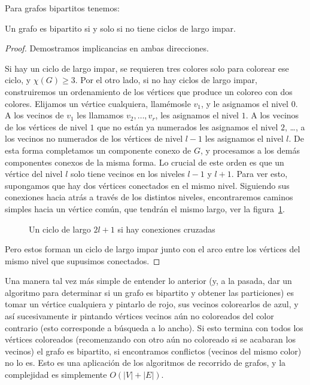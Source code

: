   Para grafos bipartitos tenemos:
  \begin{theorem}
    Un grafo es bipartito
    si y solo si no tiene ciclos de largo impar.
  \end{theorem}
  \begin{proof}
    Demostramos implicancias en ambas direcciones.

    Si hay un ciclo de largo impar,
    se requieren tres colores solo para colorear ese ciclo,
    y \(\chi(G) \ge 3\).
    Por el otro lado,
    si no hay ciclos de largo impar,
    construiremos un ordenamiento de los vértices
    que produce un coloreo con dos colores.
    Elijamos un vértice cualquiera,
    llamémosle \(v_1\),
    y le asignamos el nivel \(0\).
    A los vecinos de \(v_1\) les llamamos
    \(v_2, \dotsc, v_r\),
    les asignamos el nivel \(1\).
    A los vecinos de los vértices de nivel \(1\)
    que no están ya numerados
    les asignamos el nivel \(2\),
    \ldots,
    a los vecinos no numerados de los vértices de nivel \(l - 1\)
    les asignamos el nivel \(l\).
    De esta forma completamos un componente conexo de \(G\),
    y procesamos a los demás componentes conexos de la misma forma.
    Lo crucial de este orden es que un vértice del nivel \(l\)
    solo tiene vecinos en los niveles \(l - 1\) y \(l + 1\).
    Para ver esto,
    supongamos que hay dos vértices conectados en el mismo nivel.
    Siguiendo sus conexiones hacia atrás
    a través de los distintos niveles,
    encontraremos caminos simples hacia un vértice común,
    que tendrán el mismo largo,
    ver la figura~\ref{fig:ciclo-impar}.
    \begin{figure}[htbp]
      \centering
      \caption{Un ciclo de largo $2 l + 1$
	       si hay conexiones cruzadas}
      \label{fig:ciclo-impar}
    \end{figure}
    Pero estos forman un ciclo de largo impar
    junto con el arco entre los vértices del mismo nivel
    que supusimos conectados.
  \end{proof}

  Una manera tal vez más simple de entender lo anterior
  (y, a la pasada,
   dar un algoritmo para determinar si un grafo es bipartito
   y obtener las particiones)
  es tomar un vértice cualquiera y pintarlo de rojo,
  sus vecinos colorearlos de azul,
  y así sucesivamente
  ir pintando vértices vecinos aún no coloreados
  del color contrario
  (esto corresponde a búsqueda a lo ancho).
  Si esto termina con todos los vértices coloreados
  (recomenzando con otro aún no coloreado
   si se acabaran los vecinos)
  el grafo es bipartito,
  si encontramos conflictos
  (vecinos del mismo color)
  no lo es.
  Esto es una aplicación de los algoritmos de recorrido de grafos,
  y la complejidad
  es simplemente \(O(\lvert V \rvert + \lvert E \rvert)\).


